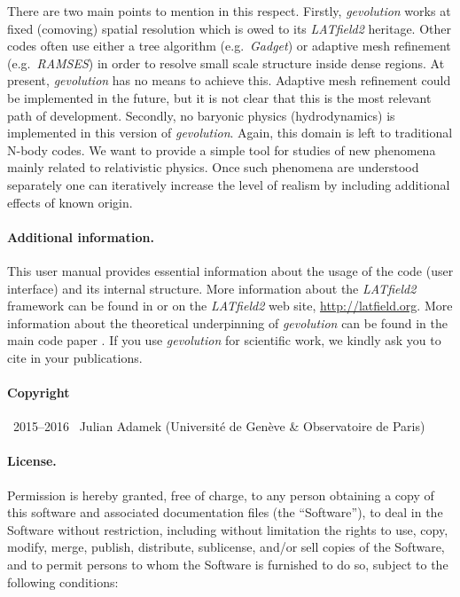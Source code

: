 \documentclass[a4paper,10pt]{article}
\begin{document}
There are two main points to mention in this respect. Firstly, \textit{gevolution} works at fixed (comoving) spatial resolution which is
owed to its \textit{LATfield2} heritage. Other codes often use either a tree algorithm (e.g.\ \textit{Gadget}) or adaptive mesh
refinement (e.g.\ \textit{RAMSES}) in order to resolve small scale structure inside dense regions. At present, \textit{gevolution} has no
means to achieve this. Adaptive mesh refinement could be implemented in the future, but it is not clear that this is the most relevant
path of development. Secondly, no baryonic physics (hydrodynamics) is implemented in this version of \textit{gevolution}. Again, this
domain is left to traditional N-body codes. We want to provide a simple tool for studies of new phenomena mainly related to relativistic 
physics. Once such phenomena are understood separately one can iteratively increase the level of realism by including additional effects of 
known origin.

\paragraph{Additional information.} This user manual provides essential information about the usage of the code (user interface) and its
internal structure. More information about the \textit{LATfield2} framework can be found in \cite{David:2015eya} or on the
\textit{LATfield2} web site, \url{http://latfield.org}. More information about the theoretical underpinning of \textit{gevolution} can
be found in the main code paper \cite{Adamek:2016zes}. If you use \textit{gevolution} for scientific work, we kindly ask you to cite
\cite{Adamek:2015eda} in your publications.

\paragraph{Copyright} \textcopyright~2015--2016~ Julian Adamek (Universit\'e de Gen\`eve \& Observatoire de Paris)

\paragraph{License.} Permission is hereby granted, free of charge, to any person obtaining a copy
of this software and associated documentation files (the ``Software''), to deal
in the Software without restriction, including without limitation the rights
to use, copy, modify, merge, publish, distribute, sublicense, and/or sell
copies of the Software, and to permit persons to whom the Software is
furnished to do so, subject to the following conditions:
  
\end{document}
